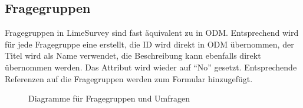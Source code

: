 \subsection{Fragegruppen}
\label{m:qg}
Fragegruppen in LimeSurvey sind fast äquivalent zu  in ODM.
Entsprechend wird für jede Fragegruppe eine  erstellt, die ID wird direkt in ODM übernommen, der Titel wird als Name verwendet, die Beschreibung kann ebenfalls direkt übernommen werden.
Das Attribut  wird wieder auf \enquote{No} gesetzt. %
Entsprechende Referenzen auf die Fragegruppen werden zum Formular hinzugefügt.

\begin{figure}[h]
		\caption{Diagramme für Fragegruppen und Umfragen}
\end{figure}

